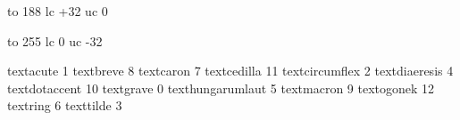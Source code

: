 

\startmapping[ec]




 to 188 lc +32 uc 0


 to 255 lc 0 uc -32




\stopmapping

\startencoding[ec][ec] %

 textacute         1
 textbreve         8
 textcaron         7
 textcedilla      11
 textcircumflex    2
 textdiaeresis     4
 textdotaccent    10
 textgrave         0
 texthungarumlaut  5
 textmacron        9
 textogonek       12
 textring          6
 texttilde         3

